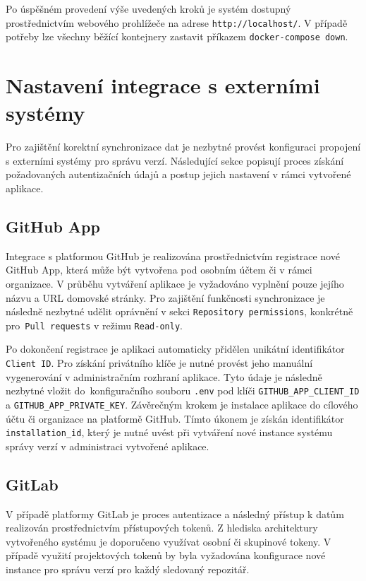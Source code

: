 Po úspěšném provedení výše uvedených kroků je systém dostupný prostřednictvím webového prohlížeče na adrese \texttt{http://localhost/}. V případě potřeby lze všechny běžící kontejnery zastavit příkazem \texttt{docker-compose down}.

\section{Nastavení integrace s externími systémy}
Pro zajištění korektní synchronizace dat je nezbytné provést konfiguraci propojení s externími systémy pro správu verzí. Následující sekce popisují proces získání požadovaných autentizačních údajů a postup jejich nastavení v rámci vytvořené aplikace.

\subsection{GitHub App}
Integrace s platformou GitHub je realizována prostřednictvím registrace nové GitHub App, která může být vytvořena pod osobním účtem či v rámci organizace. V průběhu vytváření aplikace je vyžadováno vyplnění pouze jejího názvu a URL domovské stránky. Pro zajištění funkčnosti synchronizace je následně nezbytné udělit oprávnění v sekci \texttt{Repository permissions}, konkrétně pro~\texttt{Pull requests} v režimu \texttt{Read-only}.

Po dokončení registrace je aplikaci automaticky přidělen unikátní identifikátor \texttt{Client ID}. Pro získání privátního klíče je nutné provést jeho manuální vygenerování v administračním rozhraní aplikace. Tyto údaje je následně nezbytné vložit do~konfiguračního souboru \texttt{.env} pod klíči \texttt{GITHUB\_APP\_CLIENT\_ID} a \texttt{GITHUB\_APP\_PRIVATE\_KEY}. Závěrečným krokem je instalace aplikace do cílového účtu či organizace na platformě GitHub. Tímto úkonem je získán identifikátor \texttt{installation\_id}, který je nutné uvést při vytváření nové instance systému správy verzí v administraci vytvořené aplikace.

\subsection{GitLab}
V případě platformy GitLab je proces autentizace a následný přístup k datům realizován prostřednictvím přístupových tokenů. Z hlediska architektury vytvořeného systému je doporučeno využívat osobní či skupinové tokeny. V případě využití projektových tokenů by byla vyžadována konfigurace nové instance pro správu verzí pro každý sledovaný repozitář.


